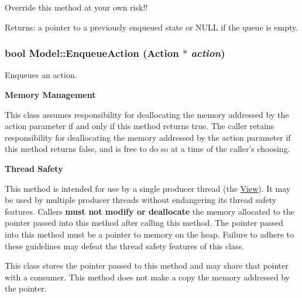 Override this method at your own risk!!  \begin{Desc}
\item[Returns:]a pointer to a previously enqueued state or NULL if the queue is empty. \end{Desc}
\hypertarget{classModel_1273906325b572fe38cc3c74c8f0f831}{
\subsubsection[{EnqueueAction}]{\setlength{\rightskip}{0pt plus 5cm}bool Model::EnqueueAction ({\bf Action} $\ast$ {\em action})}}
\label{classModel_1273906325b572fe38cc3c74c8f0f831}


Enqueues an action. 

{\bf Memory Management} 

This class assumes responsibility for deallocating the memory addressed by the action parameter if and only if this method returns true. The caller retains responsibility for deallocating the memory addressed by the action parameter if this method returns false, and is free to do so at a time of the caller's choosing. 

{\bf Thread Safety} 

This method is intended for use by a single producer thread (the \hyperlink{classView}{View}). It may be used by multiple producer threads without endangering its thread safety features. Callers {\bf must not modify or deallocate} the memory allocated to the pointer passed into this method after calling this method. The pointer passed into this method must be a pointer to memory on the heap. Failure to adhere to these guidelines may defeat the thread safety features of this class. 

This class stores the pointer passed to this method and may share that pointer with a consumer. This method does not make a copy the memory addressed by the pointer. 

